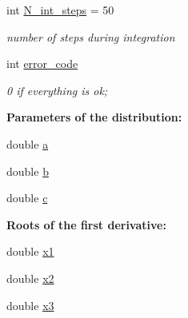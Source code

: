 \begin{DoxyCompactItemize}
int \hyperlink{class_p_c_a_1_1_double_well_rand_a935058a518ed28d62b9e2285c30382dc}{N\+\_\+int\+\_\+steps} = 50
\begin{DoxyCompactList}\small\item\em number of steps during integration \end{DoxyCompactList}\item 
int \hyperlink{class_p_c_a_1_1_double_well_rand_ab5eed0e97bd8309d5fa44fa2c7d8cbfd}{error\+\_\+code}
\begin{DoxyCompactList}\small\item\em 0 if everything is ok; \end{DoxyCompactList}\end{DoxyCompactItemize}
\begin{Indent}{\bf Parameters of the distribution\+:}\par
\begin{DoxyCompactItemize}
\item 
double \hyperlink{class_p_c_a_1_1_double_well_rand_a2291611a2ea4d9c3ee50a904c2fea9b7}{a}
\item 
double \hyperlink{class_p_c_a_1_1_double_well_rand_a289b59fbd571f8f377888f48a8c6b8ae}{b}
\item 
double \hyperlink{class_p_c_a_1_1_double_well_rand_a855b2106b6b692f9e837ef282b658c85}{c}
\end{DoxyCompactItemize}
\end{Indent}
\begin{Indent}{\bf Roots of the first derivative\+:}\par
\begin{DoxyCompactItemize}
\item 
double \hyperlink{class_p_c_a_1_1_double_well_rand_ab624775bcfb6b575ae1aa099bcd78cd7}{x1}
\item 
double \hyperlink{class_p_c_a_1_1_double_well_rand_a116879814f1ddd7bfc1efc3c11bf8c5b}{x2}
\item 
double \hyperlink{class_p_c_a_1_1_double_well_rand_a2ac7d1cea509a918639ccb8bef3f1d0a}{x3}
\end{DoxyCompactItemize}
\end{Indent}
